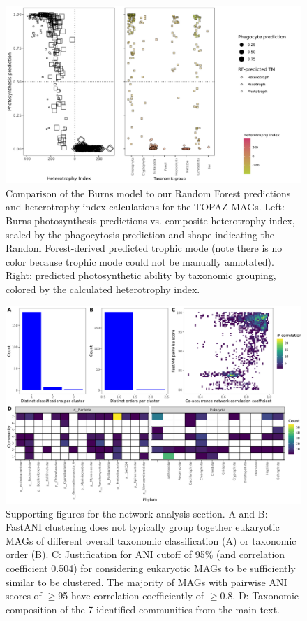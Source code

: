 \documentclass[12pt]{article}
\numberwithin{equation}{section}
\begin{document}
\begin{figure}
    \centering
    \includegraphics[width=0.95\columnwidth]{si-figures/mag_burns.png}
    \caption{Comparison of the Burns \cite{burns2018gene} model to our Random Forest predictions and heterotrophy index calculations for the TOPAZ MAGs. Left: Burns \cite{burns2018gene} photosynthesis predictions vs. composite heterotrophy index, scaled by the phagocytosis prediction and shape indicating the Random Forest-derived predicted trophic mode (note there is no color because trophic mode could not be manually annotated). Right: predicted photosynthetic ability by taxonomic grouping, colored by the calculated heterotrophy index.}
    \label{fig:mag-burns}
\end{figure}

\begin{landscape}
    \begin{figure}
        \centering
        \includegraphics[width=0.95\columnwidth]{si-figures/network_supporting.png}
        \caption{Supporting figures for the network analysis section. A and B: FastANI clustering does not typically group together eukaryotic MAGs of different overall taxonomic classification (A) or taxonomic order (B). C: Justification for ANI cutoff of 95\% (and correlation coefficient 0.504) for considering eukaryotic MAGs to be sufficiently similar to be clustered. The majority of MAGs with pairwise ANI scores of $\geq$95 have correlation coefficiently of $\geq$0.8. D: Taxonomic composition of the 7 identified communities from the main text.}
        \label{fig:network-support}
    \end{figure}
\end{landscape}
\end{document}
